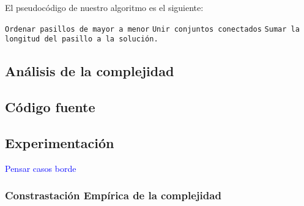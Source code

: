El pseudocódigo de nuestro algoritmo es el siguiente:

\begin{algorithmic} 

\STATE \texttt{Ordenar pasillos de mayor a menor}
		\STATE \texttt{Unir conjuntos conectados}
	\ELSE
		\STATE \texttt{Sumar la longitud del pasillo a la soluci\'on.}
	\ENDIF
\ENDFOR
\end{algorithmic} 


\subsection{Análisis de la complejidad}

\subsection{Código fuente}

\subsection{Experimentación}
\textcolor{blue}{Pensar casos borde}

\subsubsection{Constrastación Empírica de la complejidad}
